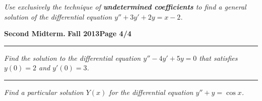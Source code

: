 \documentclass[12pt]{article}
\begin{document}
\bigskip
{\problem[30 pts] \em Use exclusively the technique of
\textbf{undetermined coefficients} to find a general solution of the
differential equation $y''+3y'+2y=x-2$.}
\vspace{20cm}
\begin{flushright}
\end{flushright}
\newpage

\hfill{\large\bf Second Midterm.}\hfill{\large\bf
  Fall 2013}\hfill{\large\bf Page 4/4}\hrule

\bigskip
{\problem[20 pts] \em Find the solution to the differential equation
$y''-4y'+5y=0$ that satisfies $y(0)=2$ and $y'(0)=3$.}
\vspace{6cm}
\begin{flushright}
\end{flushright}
\hrule
{\problem[20] \em Find a particular solution $Y(x)$ for the differential
equation $y''+y=\cos x$.}
\vspace{11.5cm}
\begin{flushright}
\end{flushright}
\end{document}
